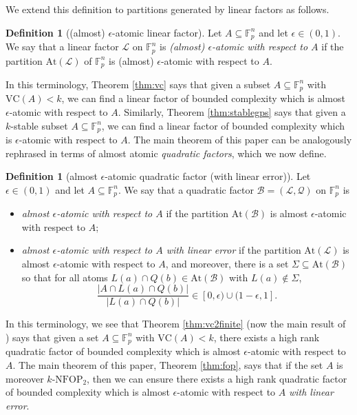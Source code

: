 \documentclass[12pt,oneside,british,a4wide]{amsart}
\numberwithin{equation}{section}
\theoremstyle{definition}
\newtheorem{definition}[theorem]{Definition}
\def\F{\mathbb{F}}
\def\NFOP{\mathrm{NFOP}}
\def\VC{\mathrm{VC}}
\def\e{\epsilon}
\newcommand{\calL}{\mathcal{L}}
\newcommand{\calB}{\mathcal{B}}
\newcommand{\calQ}{\mathcal{Q}}
\newcommand{\At}{{\mathrm{At}}}
\begin{document}
We extend this definition to partitions generated by linear factors as follows.  
\begin{definition}[(almost) $\e$-atomic linear factor]
Let $A\subseteq \F_p^n$ and let $\e\in (0,1)$. We say that a linear factor $\calL$ on $\F_p^n$ is \emph{(almost) $\e$-atomic with respect to $A$} if the partition $\At(\calL)$ of $\F_p^n$ is (almost) $\e$-atomic with respect to $A$.
\end{definition}

In this terminology,  Theorem \ref{thm:vc} says that given a subset $A\subseteq \F_p^n$ with $\VC(A)<k$, we can find a linear factor of bounded complexity which is almost $\e$-atomic with respect to $A$. Similarly, Theorem \ref{thm:stablegps} says that given a $k$-stable subset $A\subseteq \F_p^n$, we can find a linear factor of bounded complexity which is $\e$-atomic with respect to $A$.  The main theorem of this paper can be analogously rephrased in terms of almost atomic \emph{quadratic factors}, which we now define.

\begin{definition}[almost $\e$-atomic quadratic factor (with linear error)]
Let $\e\in (0,1)$ and let $A\subseteq \F_p^n$. We say that a quadratic factor $\calB=(\calL,\calQ)$ on $\F_p^n$ is 
\begin{itemize}
\item \emph{almost $\e$-atomic with respect to $A$} if the partition $\At(\calB)$ is almost $\e$-atomic with respect to $A$;
\item \emph{almost $\e$-atomic with respect to $A$ with linear error} if the partition $\At(\calL)$ is almost $\e$-atomic with respect to $A$, and moreover, there is a set $\Sigma\subseteq \At(\calB)$ so that for all atoms $L(a)\cap Q(b)\in \At(\calB)$ with  $L(a)\notin \Sigma$,  
\[\frac{|A\cap L(a)\cap Q(b)|}{|L(a)\cap Q(b)|}\in [0,\e)\cup (1-\e,1].\]
\end{itemize}
\end{definition}

In this terminology, we see that Theorem \ref{thm:vc2finite} (now the main result of \cite{Terry.2021d}) says that given a set $A\subseteq \F_p^n$ with $\VC(A)<k$, there exists a high rank quadratic factor of bounded complexity which is almost $\e$-atomic with respect to $A$.  The main theorem of this paper, Theorem \ref{thm:fop}, says that if the set $A$ is moreover $k$-$\NFOP_2$, then we can ensure there exists a high rank quadratic factor of bounded complexity which is almost $\e$-atomic with respect to $A$ \emph{with linear error}.
\end{document}
